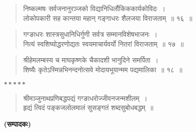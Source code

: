 {\begin{verse}
निष्कल्मषः सर्वजनानुरञ्जको विद्यानिधिर्लौकिककार्यकोविदः~।\\
लोकोपकारी सह कान्तया महान् गङ्गाधरः शैलजया विराजताम्~॥ १६~॥
\end{verse}

\begin{verse}
गग्ङाधरः शास्त्रसुधानिधिर्गुणी सर्वत्र सम्मानविशेषभाजनः~।\\
नित्यं स्वशिष्योद्धरणोद्यतः स्वयमाचार्यवर्यो नितरां विराजताम्~॥ १७~॥
\end{verse}

\begin{verse}
श्रीहेमलम्बस्य च माघकृष्णके चैकादशी भानुदिने समर्पिता~।\\
शिष्यैः कृतेऽस्मिन्नभिनन्दनोत्सवे मोदायभूयान्मम पद्यमालिका~॥ १८~॥
\end{verse}

\centerline{$*****$}

\begin{verse}
श्रीमञ्जुनाथप्रणिबद्धपद्यं गग्ङाधरोज्जीवनजन्मशीलम्~।\\
हृद्यं त्विदं पङ्कजलोलमालं सुसङ्गतं शब्दसुबोधबद्धम्~॥
\end{verse}


\hspace{6cm}\textbf{(सम्पादकः)}

\articleend
}
